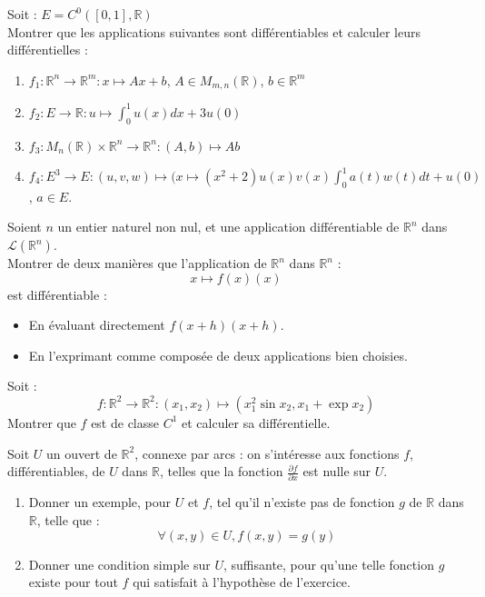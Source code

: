 
\begin{exer}
Soit : $E = C^0([0,1],\mathbb{R})$\\
Montrer que les applications suivantes sont différentiables et calculer leurs différentielles :
\begin{enumerate}
\item $f_1 : \mathbb{R}^n \rightarrow \mathbb{R}^m : x \mapsto Ax + b$, $A \in M_{m,n}(\mathbb{R})$, $b \in \mathbb{R}^m$
\item $f_2 : E \rightarrow \mathbb{R} : u \mapsto \int_{0}^1 u(x) dx + 3u(0)$
\item $f_3 : M_n(\mathbb{R}) \times \mathbb{R}^n \rightarrow \mathbb{R}^n : (A,b) \mapsto Ab$
\item $f_4 : E^3 \rightarrow E : (u,v,w) \mapsto (x \mapsto (x^2 + 2)u(x)v(x)\int_{0}^1 a(t)w(t)dt + u(0)$, $a \in E$.
\end{enumerate}
\end{exer}

\begin{exer}
Soient $n$ un entier naturel non nul, et une application diff\'erentiable de $\mathbb{R}^n$ dans $\mathcal{L}(\mathbb{R}^n)$.\\
Montrer de deux mani\`eres que l'application de $\mathbb{R}^n$ dans $\mathbb{R}^n$ :
\[x\mapsto f(x)(x)\]
est diff\'erentiable :
\begin{itemize}
\item En évaluant directement $f(x+h)(x+h)$.
\item En l'exprimant comme composée de deux applications bien choisies.
\end{itemize}
\end{exer}

\begin{exer}
Soit :\[f : \mathbb{R}^2 \rightarrow \mathbb{R}^2 : (x_1,x_2) \mapsto (x_1^2 \sin x_2 , x_1 + \exp x_2)\]
Montrer que $f$ est de classe $C^1$ et calculer sa différentielle.
\end{exer}

\begin{exer}
Soit $U$ un ouvert de $\mathbb{R}^2$, connexe par arcs : %
on s'int\'eresse aux fonctions $f$, diff\'erentiables, de $U$ dans $\mathbb{R}$, telles que la fonction $\frac{\partial{f}}{\partial{x}}$ est nulle sur $U$.
\begin{enumerate}
\item Donner un exemple, pour $U$ et $f$, tel qu'il n'existe pas de fonction $g$ de $\mathbb{R}$ dans $\mathbb{R}$, telle que :
\[\forall (x,y)\in U , f(x,y)=g(y)\]
\item Donner une condition simple sur $U$, suffisante, pour qu'une telle fonction $g$ existe pour tout $f$ qui satisfait \`a l'hypoth\`ese de l'exercice.
\end{enumerate}
\end{exer}

